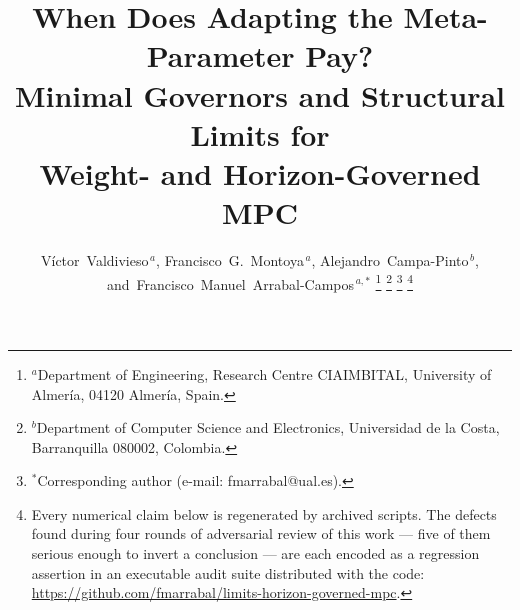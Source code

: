 \documentclass[journal]{IEEEtran}
\theoremstyle{definition}
\begin{document}
\title{When Does Adapting the Meta-Parameter Pay?\\
Minimal Governors and Structural Limits for\\
Weight- and Horizon-Governed MPC}

\author{V\'ictor~Valdivieso$^{\,a}$,
        Francisco~G.~Montoya$^{\,a}$,
        Alejandro~Campa-Pinto$^{\,b}$,
        and~Francisco~Manuel~Arrabal-Campos$^{\,a,*}$%
\thanks{$^{a}$Department of Engineering, Research Centre CIAIMBITAL,
University of Almer\'ia, 04120 Almer\'ia, Spain.}%
\thanks{$^{b}$Department of Computer Science and Electronics, Universidad de
la Costa, Barranquilla 080002, Colombia.}%
\thanks{$^{*}$Corresponding author (e-mail: fmarrabal@ual.es).}%
\thanks{Every numerical claim below is regenerated by archived scripts. The
defects found during four rounds of adversarial review of this work --- five
of them serious enough to invert a conclusion --- are each encoded as a
regression assertion in an executable audit suite distributed with the code:
\url{https://github.com/fmarrabal/limits-horizon-governed-mpc}.}}

\maketitle
\end{document}
